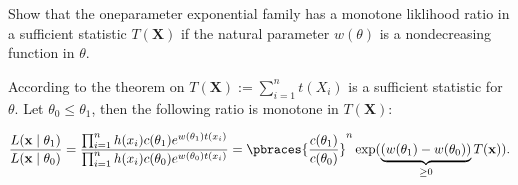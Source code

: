 
\begin{exercise}

Show that the oneparameter exponential family has a monotone liklihood ratio in a sufficient statistic $T(\mathbf X)$ if the natural parameter $w(\theta)$ is a nondecreasing function in $\theta$.

\end{exercise}


\begin{solution}

According to the theorem on \cite[lecure 8, slide 48]{EStat} $T(\mathbf X) := \sum_{i=1}^n t(X_i)$ is a sufficient statistic for $\theta$.
Let $\theta_0 \leq \theta_1$, then the following ratio is monotone in $T(\mathbf X)$:

\begin{align*}
    \frac
    {
        L(\mathbf x \mid \theta_1)
    }{
        L(\mathbf x \mid \theta_0)
    }
    =
    \frac
    {
        \prod_{i=1}^n
            h(x_i)
            c(\theta_1)
            e^{w(\theta_1) t(x_i)}
    }{
        \prod_{i=1}^n
        h(x_i)
        c(\theta_0)
        e^{w(\theta_0) t(x_i)}
    }
    =
    \pbraces
    {
        \frac{c(\theta_1)}{c(\theta_0)}
    }^n
    \exp
    (
        \underbrace
        {
            (w(\theta_1) - w(\theta_0))
        }_{
            \geq 0
        }
        T(\mathbf x)
    ).
\end{align*}

\end{solution}

